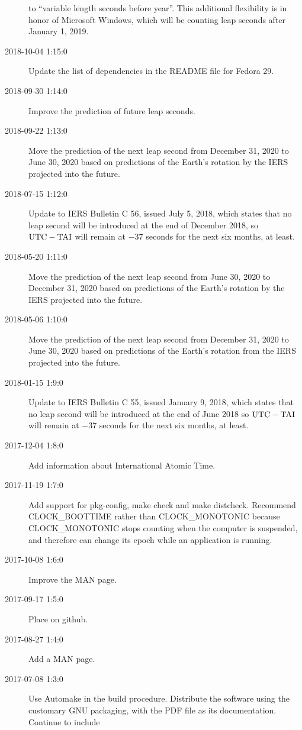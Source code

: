 \documentclass[letterpaper,twoside]{article}
\begin{document}
\begin{description}
  to ``variable length seconds before year''.  This additional flexibility
  is in honor of Microsoft Windows, which will be counting leap seconds
  after January 1, 2019.
\item[2018-10-04 1:15:0] Update the list of dependencies in the
  README file for Fedora 29.
\item[2018-09-30 1:14:0] Improve the prediction of future leap seconds.
\item[2018-09-22 1:13:0] Move the prediction of the next leap second
  from December 31, 2020 to June 30, 2020 based on predictions of
  the Earth's rotation by the IERS projected into the future.
\item[2018-07-15 1:12:0] Update to IERS Bulletin C 56, issued July
  5, 2018, which states that no leap second will be introduced
  at the end of December 2018, so $\rm{UTC}-\rm{TAI}$ will remain at
  \num{-37} seconds for the next six months, at least.
\item[2018-05-20 1:11:0] Move the prediction of the next leap second
  from June 30, 2020 to December 31, 2020 based on predictions of
  the Earth's rotation by the IERS projected into the future.
\item[2018-05-06 1:10:0] Move the prediction of the next leap second
  from December 31, 2020 to June 30, 2020 based on predictions
  of the Earth's rotation from the IERS projected into the future.
\item[2018-01-15 1:9:0] Update to IERS Bulletin C 55, issued
  January 9, 2018, which states that no leap second will be introduced
  at the end of June 2018 so $\rm{UTC}-\rm{TAI}$ will remain at
  \num{-37} seconds for the next six months, at least.
\item[2017-12-04 1:8:0] Add information about International Atomic Time.
\item[2017-11-19 1:7:0] Add support for pkg-config, make check and
  make distcheck.  Recommend CLOCK\_BOOTTIME rather than CLOCK\_MONOTONIC
  because CLOCK\_MONOTONIC stops counting when the computer is suspended,
  and therefore can change its epoch while an application is running.
\item[2017-10-08 1:6:0] Improve the MAN page.
\item[2017-09-17 1:5:0] Place on github.
\item[2017-08-27 1:4:0] Add a MAN page.
\item[2017-07-08 1:3:0] Use Automake in the build procedure.
  Distribute the software using the customary GNU packaging,
  with the PDF file as its documentation.  Continue to include

\end{description}
\end{document}
